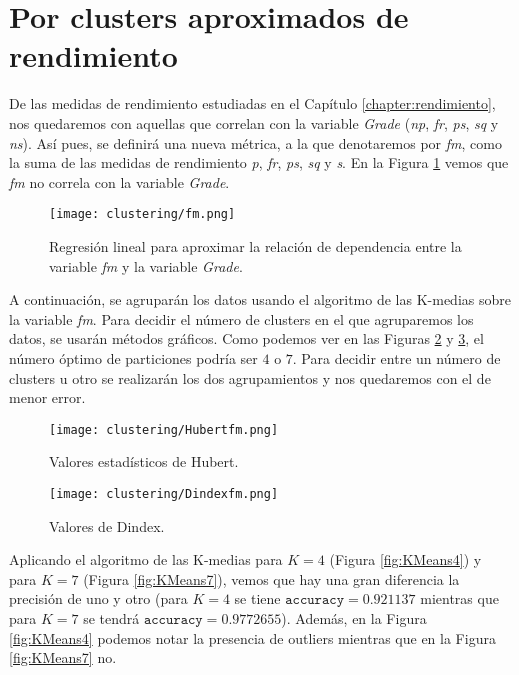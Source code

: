 \section{Por clusters aproximados de rendimiento}

De las medidas de rendimiento estudiadas en el Capítulo \ref{chapter:rendimiento}, nos quedaremos con aquellas que correlan con la variable \emph{Grade} (\emph{np}, \emph{fr}, \emph{ps}, \emph{sq} y \emph{ns}). Así pues, se definirá una nueva métrica, a la que denotaremos por \emph{fm}, como la suma de las medidas de rendimiento \emph{p}, \emph{fr}, \emph{ps}, \emph{sq} y \emph{s}. En la Figura \ref{fig:correlationfm} vemos que \emph{fm} no correla con la variable \emph{Grade}.

\begin{figure}[H]
    \centering
    \texttt{[image: clustering/fm.png]}
    \caption{Regresión lineal para aproximar la relación de dependencia entre la variable \emph{fm} y la variable \emph{Grade}.}
    \label{fig:correlationfm}
\end{figure}

A continuación, se agruparán los datos usando el algoritmo de las K-medias sobre la variable \emph{fm}. Para decidir el número de clusters en el que agruparemos los datos, se usarán métodos gráficos. Como podemos ver en las Figuras \ref{fig:indiceshubertfm} y \ref{fig:indicesdindexfm}, el número óptimo de particiones podría ser $4$ o $7$. Para decidir entre un número de clusters u otro se realizarán los dos agrupamientos y nos quedaremos con el de menor error.

\begin{figure}[H]
    \centering
    \texttt{[image: clustering/Hubertfm.png]}
    \caption{Valores estadísticos de Hubert.}
    \label{fig:indiceshubertfm}
\end{figure}

\begin{figure}[H]
    \centering
    \texttt{[image: clustering/Dindexfm.png]}
    \caption{Valores de Dindex.}
    \label{fig:indicesdindexfm}
\end{figure}

Aplicando el algoritmo de las K-medias para $K = 4$ (Figura \ref{fig:KMeans4}) y para $K = 7$ (Figura \ref{fig:KMeans7}), vemos que hay una gran diferencia la precisión de uno y otro (para $K = 4$ se tiene $\texttt{accuracy} = 0.921137$ mientras que para $K = 7$ se tendrá $\texttt{accuracy} = 0.9772655$). Además, en la Figura \ref{fig:KMeans4} podemos notar la presencia de outliers mientras que en la Figura \ref{fig:KMeans7} no.

